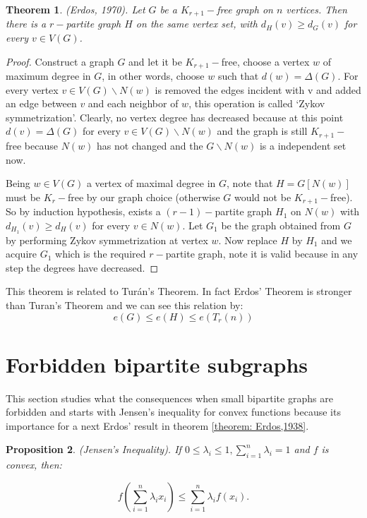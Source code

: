 \documentclass[12pt,twoside,a4paper]{book}
\numberwithin{equation}{section}
\let\setminus=\smallsetminus
\newtheorem{theorem}             {Theorem}[section]
\newtheorem{proposition}[theorem] {Proposition}
\theoremstyle{remark}
\begin{document}
\begin{theorem} (Erdos, 1970). Let $G$ be a $ K_{r+1}-$free graph on $n$ vertices. Then there is a $ r-$partite graph $H$ on the same vertex set, with $d_H(v) \geq d_G(v)$ for every $v \in V(G)$.\\
\end{theorem}

\begin{proof}
Construct a graph $G$ and let it be $K_{r+1}-$free, choose a vertex $w$ of maximum degree in $G$, in other words, choose $w$ such that $d(w)=\Delta(G)$. For every vertex $v \in V(G)\setminus N(w)$ is removed the edges incident with v and added an edge between $v$ and each neighbor of $w$, this operation is called `Zykov symmetrization'. Clearly, no vertex degree has decreased because at this point $d(v) = \Delta(G)$ for every $v \in V(G)\setminus N(w)$ and the graph is still $K_{r+1}-$free because $N(w)$ has not changed and the $G\setminus N(w)$ is a independent set now.

Being $w\in V(G)$ a vertex of maximal degree in $G$, note that $H=G[N(w)]$ must be $K_r-$free by our graph choice (otherwise $G$ would not be $K_{r+1}-$free). So by induction hypothesis, exists a $(r-1)-$partite graph $H_1$ on $N(w)$ with $d_{H_1}(v) \geq d_{H}(v)$ for every $v \in N(w)$. Let $G_1$ be the graph obtained from $G$ by performing Zykov symmetrization at vertex $w$. Now replace $H$ by $H_1$ and we acquire $G_1$ which is the required $r-$partite graph, note it is valid because in any step the degrees have decreased.
\end{proof}
This theorem is related to Turán's Theorem. In fact Erdos' Theorem is stronger than Turan's Theorem and we can see this relation by: $$e(G) \leq e(H) \leq e(T_r(n))$$
\section{Forbidden bipartite subgraphs}
This section studies what the consequences when small bipartite graphs are forbidden and starts with Jensen's inequality for convex functions because its importance for a next Erdos' result in theorem \ref{theorem: Erdos,1938}.
\begin{proposition}\label{prep:jensen}
(Jensen's Inequality). If $0\leq \lambda_i \leq 1, \sum_{i=1}^n \lambda_i = 1$ and $f$ is convex, then:

$$
f \left( \sum_{i=1}^n \lambda_i x_i\right) \leq \sum_{i=1}^n \lambda_i f (x_i).
$$

\end{proposition}
\end{document}

